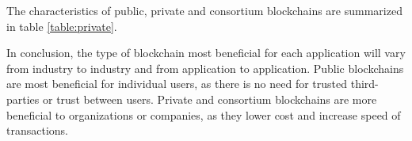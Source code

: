The characteristics of public, private and consortium blockchains are summarized in table \ref{table:private}.

\begin{table}[ht] 
 
 \centering
  \label{table:private} 
  \begin{center}
\end{center}
\end{table}

In conclusion, the type of blockchain most beneficial for each application will vary from industry to industry and from application to application. Public blockchains are most beneficial for individual users, as there is no need for trusted third-parties or trust between users. Private and consortium blockchains are more beneficial to organizations or companies, as they lower cost and increase speed of transactions.



